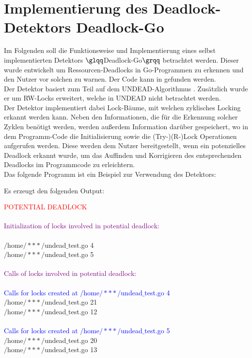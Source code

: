 \chapter{Implementierung des Deadlock-Detektors \glqq Deadlock-Go \grqq} \label{Kap::Implementaion}
Im Folgenden soll die Funktionsweise und Implementierung eines selbst implementierten 
Detektors $\glqq$Deadlock-Go$\grqq$ 
betrachtet werden. Dieser wurde entwickelt um Ressourcen-Deadlocks in Go-Programmen
zu erkennen und den Nutzer vor solchen zu warnen. Der Code kann in 
\cite{implementation} gefunden werden.\\
Der Detektor basiert zum Teil auf dem UNDEAD-Algorithmus \cite{zhou}. 
Zusätzlich wurde er um RW-Locks
erweitert, welche in UNDEAD nicht betrachtet werden.\\
Der Detektor implementiert dabei Lock-Bäume, mit welchen zyklisches Locking 
erkannt werden kann. Neben den Informationen, die für die Erkennung solcher 
Zyklen benötigt werden, werden außerdem Information darüber gespeichert, wo in dem 
Programm-Code die Initialisierung sowie die (Try-)(R-)Lock Operationen aufgerufen werden. 
Diese werden dem Nutzer bereitgestellt, wenn ein potenzielles 
Deadlock erkannt wurde, um das Auffinden und Korrigieren des entsprechenden Deadlocks 
im Programmcode zu erleichtern.\\
Das folgende Programm ist ein Beispiel zur Verwendung des Detektors:
\begin{figure}[H]
  
\end{figure}
\newpage
Es erzeugt den folgenden Output:

\begin{mdframed}[leftmargin=10pt,rightmargin=10pt]
\textcolor{red}{POTENTIAL DEADLOCK}\\\\
\textcolor{purple}{Initialization of locks involved in potential deadlock:}\\\\
$/$home$/***/$undead$\_$test.go 4\\
$/$home$/***/$undead$\_$test.go 5\\\\
\textcolor{purple}{Calls of locks involved in potential deadlock:}\\\\
\textcolor{blue}{Calls for locks created at $/$home$/***/$undead$\_$test.go 4}\\
$/$home$/***/$undead$\_$test.go 21\\
$/$home$/***/$undead$\_$test.go 12\\\\
\textcolor{blue}{Calls for locks created at $/$home$/***/$undead$\_$test.go 5}\\
$/$home$/***/$undead$\_$test.go 20\\
$/$home$/***/$undead$\_$test.go 13\
\end{mdframed}

